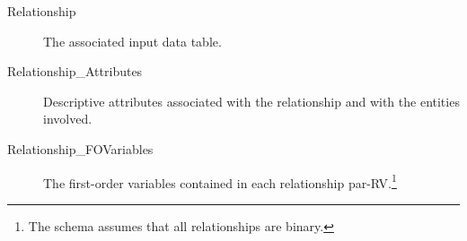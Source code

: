 \begin{description}
\item[Relationship] The associated input data table.
\item[Relationship\_Attributes] Descriptive attributes associated with the relationship and with the entities involved.
\item[Relationship\_FOVariables] The first-order variables contained in each relationship par-RV.\footnote{The schema assumes that all relationships are binary.}
\end{description}



\begin{table}[btp]
\caption{Translation from ER Diagram to Par-RVs}
 \centering
{}
 \label{table:translation}
\end{table}

